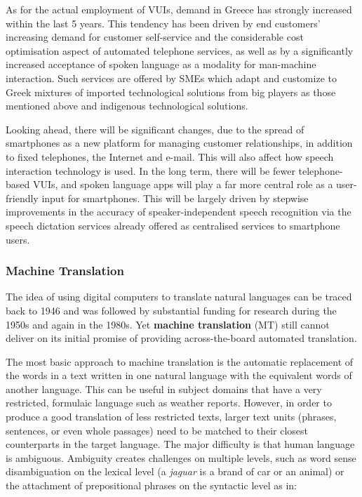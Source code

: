 \documentclass[]{../../metanetpaper}
\begin{document}
\begin{multicols}{2}
As for the actual employment of VUIs, demand in Greece has strongly increased within the last 5 years. This tendency has been driven by end customers’ increasing demand for customer self-service and the considerable cost optimisation aspect of automated telephone services, as well as by a significantly increased acceptance of spoken language as a modality for man-machine interaction. Such services are offered by SMEs which adapt and customize to Greek mixtures of imported technological solutions from big players as those mentioned above and indigenous technological solutions.

Looking ahead, there will be significant changes, due to the spread of smartphones as a new platform for managing customer relationships, in addition to fixed telephones, the Internet and e-mail. This will also affect how speech interaction technology is used. In the long term, there will be fewer telephone-based VUIs, and spoken language apps will play a far more central role as a user-friendly input for smartphones. This will be largely driven by stepwise improvements in the accuracy of speaker-independent speech recognition via the speech dictation services already offered as centralised services to smartphone users.

\subsubsection{Machine Translation}

The idea of using digital computers to translate natural languages can be traced back to 1946 and was followed by substantial funding for research during the 1950s and again in the 1980s. Yet \textbf{machine translation} (MT) still cannot deliver on its initial promise of providing across-the-board automated translation.


The most basic approach to machine translation is the automatic replacement of the words in a text written in one natural language with the equivalent words of another language. This can be useful in subject domains that have a very restricted, formulaic language such as weather reports. However, in order to produce a good translation of less restricted texts, larger text units (phrases, sentences, or even whole passages) need to be matched to their closest counterparts in the target language. The major difficulty is that human language is ambiguous. Ambiguity creates challenges on multiple levels, such as word sense disambiguation on the lexical level (a \textit{jaguar} is a brand of car or an animal) or the attachment of prepositional phrases on the syntactic level as in:


\end{multicols}
\end{document}
